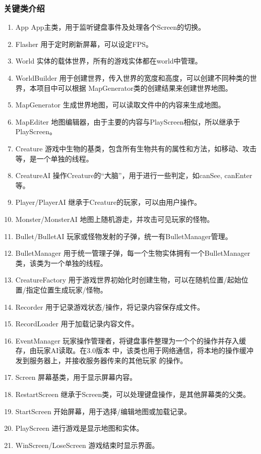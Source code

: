 \documentclass{SCIS2022cn}
\begin{document}
\subsubsection{关键类介绍}

\begin{enumerate}
    \item App
    App主类，用于监听键盘事件及处理各个Screen的切换。
    \item Flasher
    用于定时刷新屏幕，可以设定FPS。
    \item World
    实体的载体世界，所有的游戏实体都在world中管理。
    \item WorldBuilder
    用于创建世界，传入世界的宽度和高度，可以创建不同种类的世界，本项目中可以根据
    MapGenerator类的创建结果来创建世界地图。
    \item MapGenerator
    生成世界地图，可以读取文件中的内容来生成地图。
    \item MapEditer
    地图编辑器，由于主要的内容与PlayScreen相似，所以继承于PlayScreen。
    \item Creature
    游戏中生物的基类，包含所有生物共有的属性和方法，如移动、攻击等，是一个单独的线程。
    \item CreatureAI
    操作Creature的“大脑”，用于进行一些判定，如canSee, canEnter等。
    \item Player/PlayerAI
    继承于Creature的玩家，可以由用户操作。
    \item Monster/MonsterAI
    地图上随机游走，并攻击可见玩家的怪物。
    \item Bullet/BulletAI
    玩家或怪物发射的子弹，统一有BulletManager管理。
    \item BulletManager
    用于统一管理子弹，每一个生物实体拥有一个BulletManager类，该类为一个单独的线程。
    \item CreatureFactory
    用于游戏世界初始化时创建生物，可以在随机位置/起始位置/指定位置生成玩家/怪物。
    \item Recorder
    用于记录游戏状态/操作，将记录内容保存成文件。
    \item RecordLoader
    用于加载记录内容文件。
    \item EventManager
    玩家操作管理者，将键盘事件整理为一个个的操作并存入缓存，由玩家AI读取。在3.0版本
    中，该类也用于网络通信，将本地的操作缓冲发到服务器上，并接收服务器传来的其他玩家
    的操作。
    \item Screen
    屏幕基类，用于显示屏幕内容。
    \item RestartScreen
    继承于Screen类，可以处理键盘操作，是其他屏幕类的父类。
    \item StartScreen
    开始屏幕，用于选择/编辑地图或加载记录。
    \item PlayScreen
    进行游戏是显示地图和实体。
    \item WinScreen/LoseScreen
    游戏结束时显示界面。
\end{enumerate}
\end{document}
